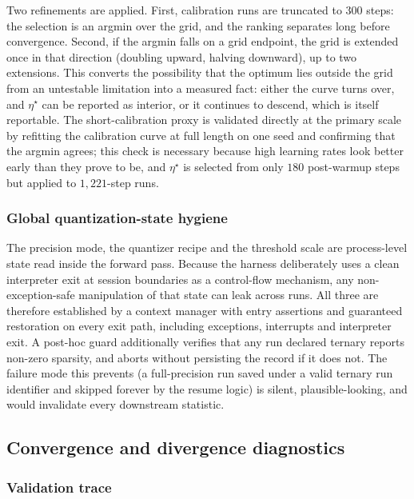 \documentclass[final,5p,times,twocolumn]{elsarticle}
\theoremstyle{remark}
\begin{document}
Two refinements are applied. First, calibration runs are truncated to $300$
steps: the selection is an argmin over the grid, and the ranking separates long
before convergence. Second, if the argmin falls on a grid endpoint, the grid is
extended once in that direction (doubling upward, halving downward), up to two
extensions. This converts the possibility that the optimum lies outside the grid from an
untestable limitation into a measured fact: either the curve turns over, and
$\eta^{\star}$ can be reported as interior, or it continues to descend, which
is itself reportable. The short-calibration proxy is validated directly at the
primary scale by refitting the calibration curve at full length on one seed and
confirming that the argmin agrees; this check is necessary because high learning
rates look better early than they prove to be, and $\eta^{\star}$ is selected
from only
$180$ post-warmup steps but applied to $1{,}221$-step runs.

\subsubsection{Global quantization-state hygiene}

The precision mode, the quantizer recipe and the threshold scale are
process-level state read inside the forward pass. Because the harness
deliberately uses a clean interpreter exit at session boundaries as a
control-flow mechanism, any non-exception-safe manipulation of that state can
leak across runs. All three are therefore established by a context manager
with entry assertions and guaranteed restoration on every exit path, including
exceptions, interrupts and interpreter exit. A post-hoc guard additionally
verifies that any run declared ternary reports non-zero sparsity, and aborts
without persisting the record if it does not. The failure mode this prevents
(a full-precision run saved under a valid ternary run identifier and skipped
forever by the resume logic) is silent, plausible-looking, and would
invalidate every downstream statistic.

\subsection{Convergence and divergence diagnostics}
\label{sec:diagnostics}

\subsubsection{Validation trace}
\end{document}
